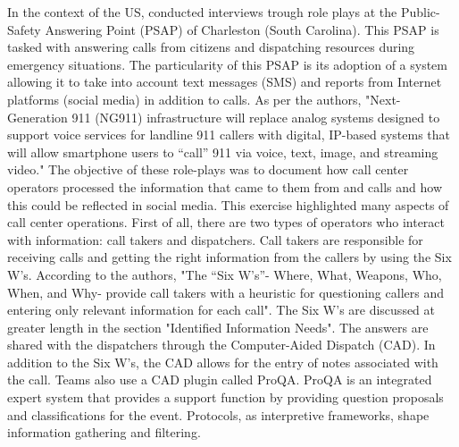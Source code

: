 In the context of the US, \textcite{graceRolePlayingNext2019} conducted interviews trough
role plays at the Public-Safety Answering Point (PSAP) of Charleston (South Carolina).
This PSAP is tasked with answering calls from citizens and dispatching resources during emergency situations.
The particularity of this PSAP is its adoption of a system allowing it to take into account
text messages (SMS) and reports from Internet platforms (social media) in addition to calls.
As per the authors, "Next-Generation 911 (NG911) infrastructure will replace analog systems
designed to support voice services for landline 911 callers with digital, IP-based systems that
will allow smartphone users to “call” 911 via voice, text, image, and streaming video."
The objective of these role-plays was to document how call center operators processed the information that came to them from and calls and how this could be reflected in social media.
This exercise highlighted many aspects of call center operations.
First of all, there are two types of operators who interact with information: call takers and dispatchers.
Call takers are responsible for receiving calls and getting the right information from the callers by using the Six W's.
According to the authors, "The “Six W’s”- Where, What, Weapons, Who, When, and Why- provide call takers with
a heuristic for questioning callers and entering only relevant information for each call".
The Six W's are discussed at greater length in the section "Identified Information Needs".
The answers are shared with the dispatchers through the Computer-Aided Dispatch (CAD).
In addition to the Six W's, the CAD allows for the entry of notes associated with the call.
Teams also use a CAD plugin called ProQA.
ProQA is an integrated expert system that provides a support function by providing question proposals and classifications for the event.
Protocols, as interpretive frameworks, shape information gathering and filtering.

